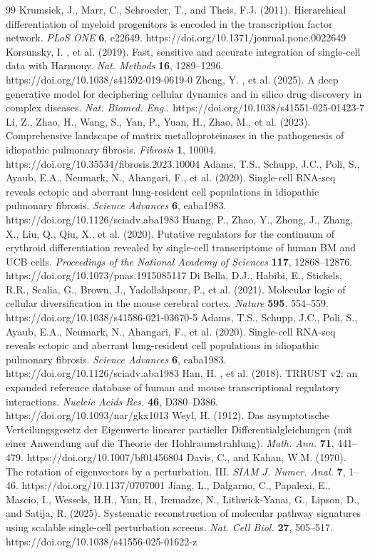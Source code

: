 \documentclass[11pt,a4paper]{article}
\begin{document}
\begin{thebibliography}{99}
 Krumsiek, J., Marr, C., Schroeder, T., and Theis, F.J. (2011). Hierarchical differentiation of myeloid progenitors is encoded in the transcription factor network. \textit{PLoS ONE} \textbf{6}, e22649. https://doi.org/10.1371/journal.pone.0022649
 Korsunsky, I. , et al. (2019). Fast, sensitive and accurate integration of single-cell data with Harmony. \textit{Nat. Methods} \textbf{16}, 1289--1296. https://doi.org/10.1038/s41592-019-0619-0
 Zheng, Y. , et al. (2025). A deep generative model for deciphering cellular dynamics and in silico drug discovery in complex diseases. \textit{Nat. Biomed. Eng.}. https://doi.org/10.1038/s41551-025-01423-7
 Li, Z., Zhao, H., Wang, S., Yan, P., Yuan, H., Zhao, M., et al. (2023). Comprehensive landscape of matrix metalloproteinases in the pathogenesis of idiopathic pulmonary fibrosis. \textit{Fibrosis} \textbf{1}, 10004. https://doi.org/10.35534/fibrosis.2023.10004
 Adams, T.S., Schupp, J.C., Poli, S., Ayaub, E.A., Neumark, N., Ahangari, F., et al. (2020). Single-cell RNA-seq reveals ectopic and aberrant lung-resident cell populations in idiopathic pulmonary fibrosis. \textit{Science Advances} \textbf{6}, eaba1983. https://doi.org/10.1126/sciadv.aba1983
 Huang, P., Zhao, Y., Zhong, J., Zhang, X., Liu, Q., Qiu, X., et al. (2020). Putative regulators for the continuum of erythroid differentiation revealed by single-cell transcriptome of human BM and UCB cells. \textit{Proceedings of the National Academy of Sciences} \textbf{117}, 12868--12876. https://doi.org/10.1073/pnas.1915085117
 Di Bella, D.J., Habibi, E., Stickels, R.R., Scalia, G., Brown, J., Yadollahpour, P., et al. (2021). Molecular logic of cellular diversification in the mouse cerebral cortex. \textit{Nature} \textbf{595}, 554--559. https://doi.org/10.1038/s41586-021-03670-5
 Adams, T.S., Schupp, J.C., Poli, S., Ayaub, E.A., Neumark, N., Ahangari, F., et al. (2020). Single-cell RNA-seq reveals ectopic and aberrant lung-resident cell populations in idiopathic pulmonary fibrosis. \textit{Science Advances} \textbf{6}, eaba1983. https://doi.org/10.1126/sciadv.aba1983
 Han, H. , et al. (2018). TRRUST v2: an expanded reference database of human and mouse transcriptional regulatory interactions. \textit{Nucleic Acids Res.} \textbf{46}, D380--D386. https://doi.org/10.1093/nar/gkx1013
 Weyl, H. (1912). Das asymptotische Verteilungsgesetz der Eigenwerte linearer partieller Differentialgleichungen (mit einer Anwendung auf die Theorie der Hohlraumstrahlung). \textit{Math. Ann.} \textbf{71}, 441--479. https://doi.org/10.1007/bf01456804
 Davis, C., and Kahan, W.M. (1970). The rotation of eigenvectors by a perturbation. III. \textit{SIAM J. Numer. Anal.} \textbf{7}, 1--46. https://doi.org/10.1137/0707001
 Jiang, L., Dalgarno, C., Papalexi, E., Mascio, I., Wessels, H.H., Yun, H., Iremadze, N., Lithwick-Yanai, G., Lipson, D., and Satija, R. (2025). Systematic reconstruction of molecular pathway signatures using scalable single-cell perturbation screens. \textit{Nat. Cell Biol.} \textbf{27}, 505--517. https://doi.org/10.1038/s41556-025-01622-z
\end{thebibliography}
\end{document}
